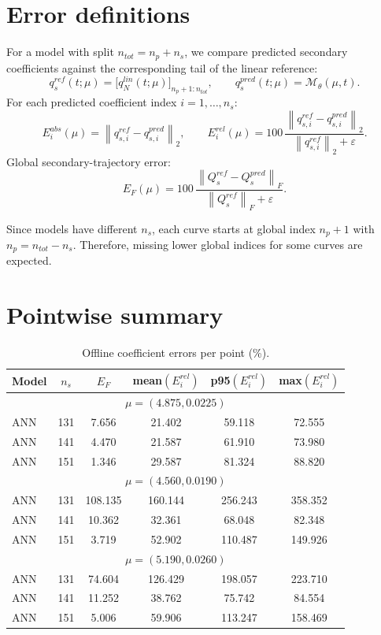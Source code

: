 \documentclass[11pt]{article}
\begin{document}
\section*{Error definitions}
For a model with split $n_{tot}=n_p+n_s$, we compare predicted secondary coefficients against the corresponding tail of the linear reference:
\[
q_s^{ref}(t;\mu)=\big[q_N^{lin}(t;\mu)\big]_{n_p+1:n_{tot}},
\qquad
q_s^{pred}(t;\mu)=\mathcal M_{\theta}(\mu,t).
\]
For each predicted coefficient index $i=1,\dots,n_s$:
\[
E_i^{abs}(\mu)=\left\|q_{s,i}^{ref}-q_{s,i}^{pred}\right\|_2,
\qquad
E_i^{rel}(\mu)=100\,
\frac{\left\|q_{s,i}^{ref}-q_{s,i}^{pred}\right\|_2}
{\left\|q_{s,i}^{ref}\right\|_2+\varepsilon}.
\]
Global secondary-trajectory error:
\[
E_F(\mu)=100\,
\frac{\left\|Q_s^{ref}-Q_s^{pred}\right\|_F}
{\left\|Q_s^{ref}\right\|_F+\varepsilon}.
\]

Since models have different $n_s$, each curve starts at global index $n_p+1$ with $n_p=n_{tot}-n_s$.
Therefore, missing lower global indices for some curves are expected.

\section*{Pointwise summary}
\begin{table}[H]
\centering
\caption{Offline coefficient errors per point (\%).}
\begin{tabular}{lccccc}
\toprule
Model & $n_s$ & $E_F$ & mean$(E_i^{rel})$ & p95$(E_i^{rel})$ & max$(E_i^{rel})$ \\
\midrule
\multicolumn{6}{c}{\(\mu=(4.875,0.0225)\)} \\
\midrule
ANN & 131 & 7.656 & 21.402 & 59.118 & 72.555 \\
ANN & 141 & 4.470 & 21.587 & 61.910 & 73.980 \\
ANN & 151 & 1.346 & 29.587 & 81.324 & 88.820 \\
\midrule
\multicolumn{6}{c}{\(\mu=(4.560,0.0190)\)} \\
\midrule
ANN & 131 & 108.135 & 160.144 & 256.243 & 358.352 \\
ANN & 141 & 10.362 & 32.361 & 68.048 & 82.348 \\
ANN & 151 & 3.719 & 52.902 & 110.487 & 149.926 \\
\midrule
\multicolumn{6}{c}{\(\mu=(5.190,0.0260)\)} \\
\midrule
ANN & 131 & 74.604 & 126.429 & 198.057 & 223.710 \\
ANN & 141 & 11.252 & 38.762 & 75.742 & 84.554 \\
ANN & 151 & 5.006 & 59.906 & 113.247 & 158.469 \\
\midrule
\bottomrule
\end{tabular}
\end{table}
\end{document}
